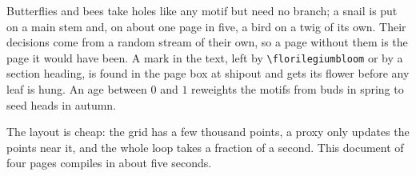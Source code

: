 \begin{remark}
  Butterflies and bees take holes like any motif but need no branch;
  a snail is put on a
  main stem and, on about one page in five, a bird on a twig of its
  own. Their decisions come
  from a random stream of their own, so a page without them is the
  page it would have been.
  A mark in the text, left by \verb|\florilegiumbloom| or by a
  section heading, is found in
  the page box at shipout and gets its flower before any leaf is
  hung. An age between $0$
  and $1$ reweights the motifs from buds in spring to seed heads in autumn.
\end{remark}

\begin{remark}[Cost]
  The layout is cheap: the grid has a few thousand points, a proxy
  only updates the points
  near it, and the whole loop takes a fraction of a second. This
  document of four pages
  compiles in about five seconds.
\end{remark}
